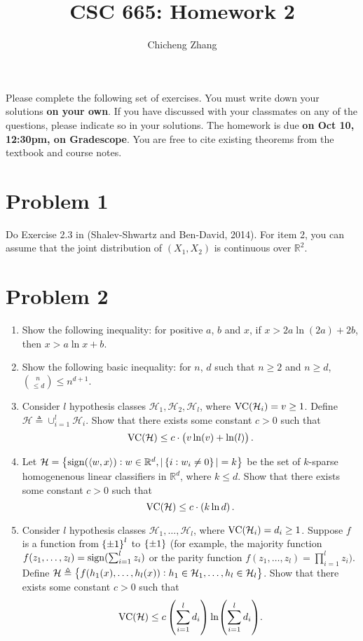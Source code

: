 \documentclass{article}
\title{CSC 665: Homework 2}
\author{Chicheng Zhang}
\DeclareMathOperator*{\sign}{{\rm sign}}
\DeclareMathOperator*{\VC}{{\rm VC}}
\newcommand{\RR}{\mathbb{R}} %
\newcommand{\Hcal}{\mathcal{H}} %
\newcommand{\defeq}{\triangleq}
\newcommand{\inner}[2]{\left\langle #1,#2 \right\rangle}
\begin{document}
\maketitle

Please complete the following set of exercises. You must write down your solutions \textbf{on your own}. If you have discussed with your classmates on any of the questions, please indicate so in your solutions.
The homework is due \textbf{on Oct 10, 12:30pm, on Gradescope}. You are free to
cite existing theorems from the textbook and course notes.

\section*{Problem 1}
Do Exercise 2.3 in (Shalev-Shwartz and Ben-David, 2014). For item 2, you can assume that the joint distribution of $(X_1, X_2)$ is continuous over $\RR^2$.


\section*{Problem 2}
\begin{enumerate}
  \item Show the following inequality: for positive $a$, $b$ and $x$,
  if $x > 2a \ln(2a) + 2b$, then $x > a \ln x + b$.
  \label{item:1-1}

  \item Show the following basic inequality: for $n$, $d$ such that $n \geq 2$ and
  $n \geq d$, ${n \choose {\leq d}} \leq n^{d+1}$.

  \item Consider $l$ hypothesis classes $\Hcal_1, \Hcal_2, \Hcal_l$, where
  $\VC(\Hcal_i) = v \geq 1$. Define $\Hcal \defeq \cup_{i=1}^l \Hcal_i$. Show
  that there exists some constant $c > 0$ such that
  \[ \VC(\Hcal) \leq c\cdot \del{v \ln(v) + \ln(l)}. \]
  \label{item:1-3}

  \item Let
  $\Hcal = \cbr{\sign(\inner{w}{x}): w \in \RR^d, |\cbr{i: w_i \neq 0}| = k}$ be
  the set of $k$-sparse homogenenous linear classifiers in $\RR^d$, where $k \leq d$.
  Show that there exists some constant $c > 0$ such that
  \[ \VC(\Hcal) \leq c \cdot \del{k \ln d}. \]

  \item Consider $l$ hypothesis classes $\Hcal_1, \ldots, \Hcal_l$, where
  $\VC(\Hcal_i) = d_i \geq 1$. Suppose $f$ is a function from $\cbr{\pm 1}^l$
  to $\cbr{\pm 1}$ (for example, the majority function
  $f(z_1,\ldots,z_l) = \sign(\sum_{i=1}^l z_i)$ or the parity function
  $f(z_1,\ldots,z_l) = \prod_{i=1}^l z_i)$.
  Define $\Hcal \defeq \cbr{ f(h_1(x), \ldots, h_l(x)): h_1 \in \Hcal_1, \ldots, h_l \in \Hcal_l}$. Show that
  there exists some constant $c > 0$ such that
  \[ \VC(\Hcal) \leq c \del{\sum_{i=1}^l d_i} \ln(\sum_{i=1}^l d_i). \]
\end{enumerate}
\end{document}
